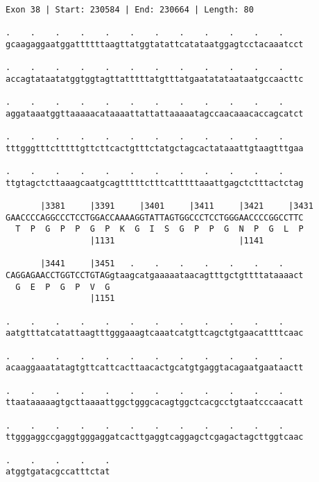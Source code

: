 \documentclass{article}
\begin{document}
\begin{Verbatim}[fontfamily=courier]
Exon 38 | Start: 230584 | End: 230664 | Length: 80

.    .    .    .    .    .    .    .    .    .    .    .    
gcaagaggaatggattttttaagttatggtatattcatataatggagtcctacaaatcct

.    .    .    .    .    .    .    .    .    .    .    .    
accagtataatatggtggtagttatttttatgtttatgaatatataataatgccaacttc

.    .    .    .    .    .    .    .    .    .    .    .    
aggataaatggttaaaaacataaaattattattaaaaatagccaacaaacaccagcatct

.    .    .    .    .    .    .    .    .    .    .    .    
tttgggtttctttttgttcttcactgtttctatgctagcactataaattgtaagtttgaa

.    .    .    .    .    .    .    .    .    .    .    .    
ttgtagctcttaaagcaatgcagtttttctttcatttttaaattgagctctttactctag

       |3381     |3391     |3401     |3411     |3421     |3431
GAACCCCAGGCCCTCCTGGACCAAAAGGTATTAGTGGCCCTCCTGGGAACCCCGGCCTTC
  T  P  G  P  P  G  P  K  G  I  S  G  P  P  G  N  P  G  L  P
                 |1131                         |1141        

       |3441     |3451   .    .    .    .    .    .    .    
CAGGAGAACCTGGTCCTGTAGgtaagcatgaaaaataacagtttgctgttttataaaact
  G  E  P  G  P  V  G                                       
                 |1151                                      

.    .    .    .    .    .    .    .    .    .    .    .    
aatgtttatcatattaagtttgggaaagtcaaatcatgttcagctgtgaacattttcaac

.    .    .    .    .    .    .    .    .    .    .    .    
acaaggaaatatagtgttcattcacttaacactgcatgtgaggtacagaatgaataactt

.    .    .    .    .    .    .    .    .    .    .    .    
ttaataaaaagtgcttaaaattggctgggcacagtggctcacgcctgtaatcccaacatt

.    .    .    .    .    .    .    .    .    .    .    .    
ttgggaggccgaggtgggaggatcacttgaggtcaggagctcgagactagcttggtcaac

.    .    .    .    .
atggtgatacgccatttctat
\end{Verbatim}
\newpage
\end{document}
